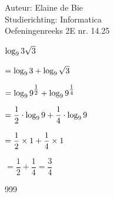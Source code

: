 \documentclass[a4paper]{article}
\begin{document}
  
\noindent \large Auteur: Elaine de Bie\\
\noindent \large Studierichting: Informatica\\
\noindent \large Oefeningenreeks 2E nr. 14.25\\

\medskip

\normalsize



$\log_9{3\sqrt{3}}\\$

$= \log_9{3} + \log_9{\sqrt{3}}\\$

$= \log_9{9^{\tfrac{1}{2}}} + \log_9{9^{\tfrac{1}{4}}}\\$

$= \dfrac{1}{2} \cdot \log_9{9} + \dfrac{1}{4} \cdot \log_9{9}\\$

$= \dfrac{1}{2} \times 1 + \dfrac{1}{4} \times 1\\$

$= \dfrac{1}{2} + \dfrac{1}{4} = \dfrac{3}{4}$




\begin{thebibliography}{999}
\end{thebibliography}
\end{document}
